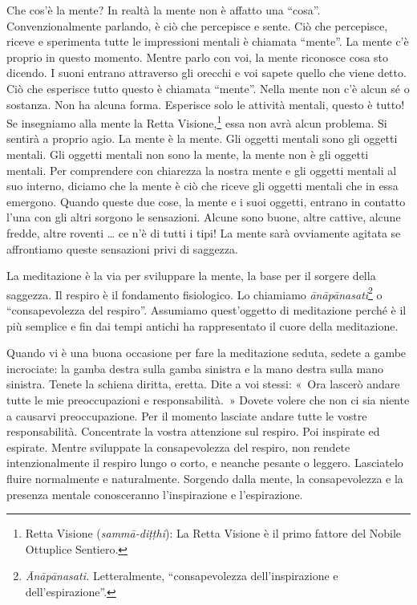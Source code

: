 Che cos'è la mente? In realtà la mente non è affatto una ``cosa''.
Convenzionalmente parlando, è ciò che percepisce e sente. Ciò che
percepisce, riceve e sperimenta tutte le impressioni mentali è chiamata
``mente''. La mente c'è proprio in questo momento. Mentre parlo con voi,
la mente riconosce cosa sto dicendo. I suoni entrano attraverso gli
orecchi e voi sapete quello che viene detto. Ciò che esperisce tutto
questo è chiamata ``mente''. Nella mente non c'è alcun sé o sostanza.
Non ha alcuna forma. Esperisce solo le attività mentali, questo è tutto!
Se insegniamo alla mente la Retta Visione,\footnote{Retta Visione
  (\emph{sammā-diṭṭhi}): La Retta Visione è il primo fattore del Nobile
  Ottuplice Sentiero.} essa non avrà alcun problema. Si sentirà a
proprio agio. La mente è la mente. Gli oggetti mentali sono gli oggetti
mentali. Gli oggetti mentali non sono la mente, la mente non è gli
oggetti mentali. Per comprendere con chiarezza la nostra mente e gli
oggetti mentali al suo interno, diciamo che la mente è ciò che riceve
gli oggetti mentali che in essa emergono. Quando queste due cose, la
mente e i suoi oggetti, entrano in contatto l'una con gli altri sorgono
le sensazioni. Alcune sono buone, altre cattive, alcune fredde, altre
roventi \ldots{} ce n'è di tutti i tipi! La mente sarà ovviamente agitata se
affrontiamo queste sensazioni privi di saggezza.

La meditazione è la via per sviluppare la mente, la base per il sorgere
della saggezza. Il respiro è il fondamento fisiologico. Lo chiamiamo
\emph{ānāpānasati}\footnote{\emph{Ānāpānasati.} Letteralmente,
  ``consapevolezza dell'inspirazione e dell'espirazione''.} o
``consapevolezza del respiro''. Assumiamo quest'oggetto di meditazione
perché è il più semplice e fin dai tempi antichi ha rappresentato il
cuore della meditazione.

Quando vi è una buona occasione per fare la meditazione seduta, sedete a
gambe incrociate: la gamba destra sulla gamba sinistra e la mano destra
sulla mano sinistra. Tenete la schiena diritta, eretta. Dite a voi
stessi: «~Ora lascerò andare tutte le mie preoccupazioni e
responsabilità.~» Dovete volere che non ci sia niente a causarvi
preoccupazione. Per il momento lasciate andare tutte le vostre
responsabilità. Concentrate la vostra attenzione sul respiro. Poi
inspirate ed espirate. Mentre sviluppate la consapevolezza del respiro,
non rendete intenzionalmente il respiro lungo o corto, e neanche pesante
o leggero. Lasciatelo fluire normalmente e naturalmente. Sorgendo dalla
mente, la consapevolezza e la presenza mentale conosceranno
l'inspirazione e l'espirazione.

